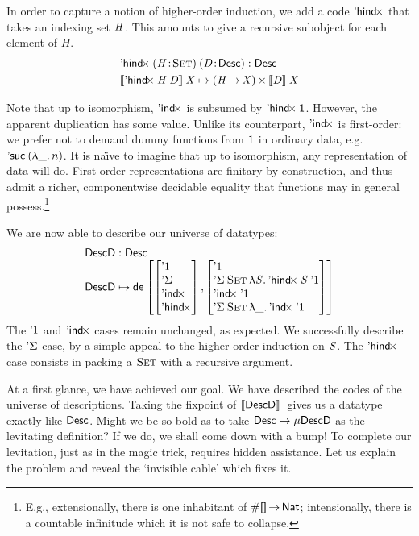 In order to capture a notion of higher-order induction, we add a code
$\SYMBDHindx$ that takes an indexing set $\V{H}$. This amounts to give
a recursive subobject for each element of $H$.
%
\[\stk{
    \DHindx{(\Bhab{\M{H}}{\Set})}{(\Bhab{\M{D}}{\Desc})} : \Desc
    \smallskip \\
    \descop{\DHindx{\V{H}}{\V{D}}}{\V{X}}     
        \mapsto 
            \TIMES{(\V{H} \To \V{X})}{\descop{\V{D}}{\V{X}}} \\
}\]


Note that up to isomorphism, $\SYMBDIndx$ is subsumed by
$\DHindx{\Unit}{\!}$. However, the apparent duplication has some
value.  Unlike its counterpart, $\SYMBDIndx$ is first-order: we prefer
not to demand dummy functions from \(\Unit\) in ordinary data,
e.g. \(\NatSuc{(\LAM{\_}n)}\). It is na{\"\i}ve to imagine that up to
isomorphism, any representation of data will do.  First-order
representations are finitary by construction, and thus admit a richer,
componentwise decidable equality that functions may in
general possess.\footnote{E.g., extensionally, there is one inhabitant of
\(\EnumT{\void}\To\Nat\); intensionally, there is a countable infinitude
which it is not safe to collapse.}

We are now able to describe our universe of datatypes:
%
\[\stk{
\DescD : \Desc \\
\DescD \mapsto\tada
{\stkm{ \DUnit\\ \SYMBDSigma\\ \SYMBDIndx\\ \SYMBDHindx}}
{\stkm{
\DUnit                                            \\
                                   \DSigma{\Set}{\LAM{\V{S}} \DHindx{\V{S}}{\DUnit}}   \\
                                   \DIndx{\DUnit}                                    \\
                                   \DSigma{\Set}{\LAM{\_} \DIndx{\DUnit}}
}}
}\]
%
The $\DUnit$ and $\SYMBDIndx$ cases remain unchanged, as expected. We
successfully describe the $\SYMBDSigma$ case, by a simple appeal to
the higher-order induction on $\V{S}$. The $\SYMBDHindx$ case
consists in packing a $\Set$ with a recursive argument.

At a first glance, we have achieved our goal. We have described the
codes of the universe of descriptions. Taking the fixpoint of \(\descop{\DescD}\)
gives us a datatype exactly like $\Desc$. Might we be
so bold as to take \(\Desc \mapsto \Mu{\DescD}\) as the levitating
definition? If we do, we shall come down with a bump! 
To complete our levitation, just as in the magic trick, requires
hidden assistance. Let us explain the problem and reveal the `invisible
cable' which fixes it.


